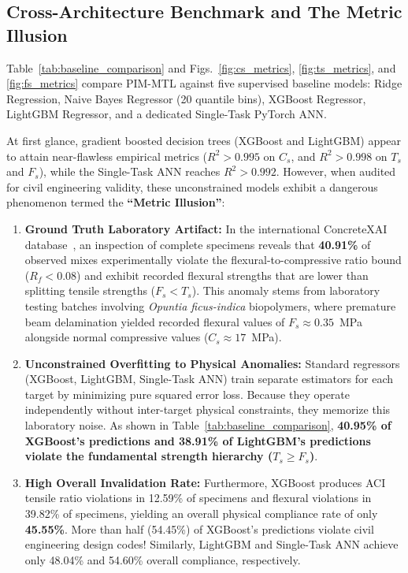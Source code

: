 \documentclass[conference]{IEEEtran}
\begin{document}
\subsection{Cross-Architecture Benchmark and The Metric Illusion}
Table~\ref{tab:baseline_comparison} and Figs.~\ref{fig:cs_metrics}, \ref{fig:ts_metrics}, and \ref{fig:fs_metrics} compare PIM-MTL against five supervised baseline models: Ridge Regression, Naive Bayes Regressor (20 quantile bins), XGBoost Regressor, LightGBM Regressor, and a dedicated Single-Task PyTorch ANN.

At first glance, gradient boosted decision trees (XGBoost and LightGBM) appear to attain near-flawless empirical metrics ($R^2 > 0.995$ on $C_s$, and $R^2 > 0.998$ on $T_s$ and $F_s$), while the Single-Task ANN reaches $R^2 > 0.992$. However, when audited for civil engineering validity, these unconstrained models exhibit a dangerous phenomenon termed the \textbf{``Metric Illusion''}:
\begin{enumerate}
    \item \textbf{Ground Truth Laboratory Artifact:} In the international ConcreteXAI database~\cite{guzman2024concretexai}, an inspection of complete specimens reveals that \textbf{40.91\%} of observed mixes experimentally violate the flexural-to-compressive ratio bound ($R_f < 0.08$) and exhibit recorded flexural strengths that are lower than splitting tensile strengths ($F_s < T_s$). This anomaly stems from laboratory testing batches involving \textit{Opuntia ficus-indica} biopolymers, where premature beam delamination yielded recorded flexural values of $F_s \approx 0.35$~MPa alongside normal compressive values ($C_s \approx 17$~MPa).
    \item \textbf{Unconstrained Overfitting to Physical Anomalies:} Standard regressors (XGBoost, LightGBM, Single-Task ANN) train separate estimators for each target by minimizing pure squared error loss. Because they operate independently without inter-target physical constraints, they memorize this laboratory noise. As shown in Table~\ref{tab:baseline_comparison}, \textbf{40.95\% of XGBoost's predictions and 38.91\% of LightGBM's predictions violate the fundamental strength hierarchy ($T_s \ge F_s$)}. 
    \item \textbf{High Overall Invalidation Rate:} Furthermore, XGBoost produces ACI tensile ratio violations in 12.59\% of specimens and flexural violations in 39.82\% of specimens, yielding an overall physical compliance rate of only \textbf{45.55\%}. More than half (54.45\%) of XGBoost's predictions violate civil engineering design codes! Similarly, LightGBM and Single-Task ANN achieve only 48.04\% and 54.60\% overall compliance, respectively.
\end{enumerate}
\end{document}
